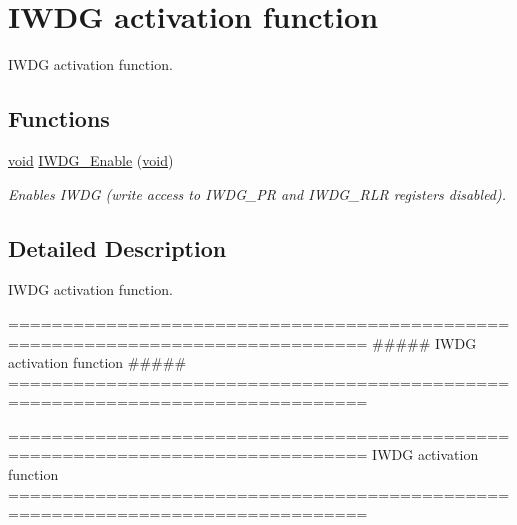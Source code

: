 \hypertarget{group___i_w_d_g___group2}{\section{I\-W\-D\-G activation function}
\label{group___i_w_d_g___group2}
}


I\-W\-D\-G activation function.  


\subsection*{Functions}
\begin{DoxyCompactItemize}
\item 
\hyperlink{group___n_a_m_e_ga18028b8badbf1ea7e704ccac3c488e82}{void} \hyperlink{group___i_w_d_g___group2_ga479b2921c86f8c67b819f5c4bea6bdb6}{I\-W\-D\-G\-\_\-\-Enable} (\hyperlink{group___n_a_m_e_ga18028b8badbf1ea7e704ccac3c488e82}{void})
\begin{DoxyCompactList}\small\item\em Enables I\-W\-D\-G (write access to I\-W\-D\-G\-\_\-\-P\-R and I\-W\-D\-G\-\_\-\-R\-L\-R registers disabled). \end{DoxyCompactList}\end{DoxyCompactItemize}


\subsection{Detailed Description}
I\-W\-D\-G activation function. \begin{DoxyVerb} ===============================================================================
                    ##### IWDG activation function #####
 ===============================================================================  \end{DoxyVerb}


\begin{DoxyVerb} ===============================================================================
                          IWDG activation function
 ===============================================================================  \end{DoxyVerb}
 

